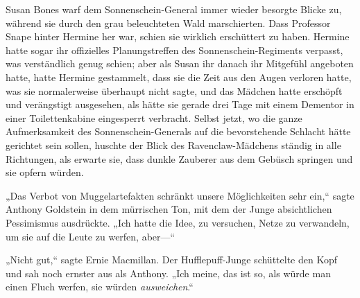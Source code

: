 Susan Bones warf dem Sonnenschein-General immer wieder besorgte Blicke zu, während sie durch den grau beleuchteten Wald marschierten. Dass Professor Snape hinter Hermine her war, schien sie wirklich erschüttert zu haben. Hermine hatte sogar ihr offizielles Planungstreffen des Sonnenschein-Regiments verpasst, was verständlich genug schien; aber als Susan ihr danach ihr Mitgefühl angeboten hatte, hatte Hermine gestammelt, dass sie die Zeit aus den Augen verloren hatte, was sie normalerweise überhaupt nicht sagte, und das Mädchen hatte erschöpft und verängstigt ausgesehen, als hätte sie gerade drei Tage mit einem Dementor in einer Toilettenkabine eingesperrt verbracht. Selbst jetzt, wo die ganze Aufmerksamkeit des Sonnenschein-Generals auf die bevorstehende Schlacht hätte gerichtet sein sollen, huschte der Blick des Ravenclaw-Mädchens ständig in alle Richtungen, als erwarte sie, dass dunkle Zauberer aus dem Gebüsch springen und sie opfern würden.

„Das Verbot von Muggelartefakten schränkt unsere Möglichkeiten sehr ein,“ sagte Anthony Goldstein in dem mürrischen Ton, mit dem der Junge absichtlichen Pessimismus ausdrückte. „Ich hatte die Idee, zu versuchen, Netze zu verwandeln, um sie auf die Leute zu werfen, aber—“

„Nicht gut,“ sagte Ernie Macmillan. Der Hufflepuff-Junge schüttelte den Kopf und sah noch ernster aus als Anthony. „Ich meine, das ist so, als würde man einen Fluch werfen, sie würden \emph{ausweichen}.“

